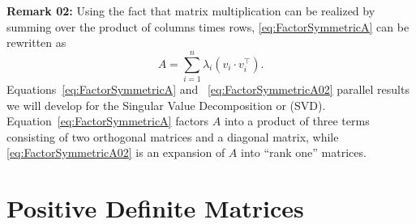 \begin{tcolorbox}[sharp corners, colback=green!30, colframe=green!80!blue, title=\textbf{\large Factoring a Symmetric Matrix}]
\textbf{Remark 02:} Using the fact that matrix multiplication can be realized by summing over the product of columns times rows, \eqref{eq:FactorSymmetricA} can be rewritten as 
\begin{equation}
    \label{eq:FactorSymmetricA02}
    A = \sum_{i=1}^n \lambda_i \left( v_i \cdot v_i^\top\right).
\end{equation}
Equations~\eqref{eq:FactorSymmetricA} and ~\eqref{eq:FactorSymmetricA02} parallel results we will develop for the Singular Value Decomposition or (SVD). Equation~\eqref{eq:FactorSymmetricA} factors $A$ into a product of three terms consisting of two orthogonal matrices and a diagonal matrix, while \eqref{eq:FactorSymmetricA02} is an expansion of $A$ into ``rank one'' matrices. 

\end{tcolorbox}



\section{Positive Definite Matrices}
\label{sec:PosDefMatrices}


